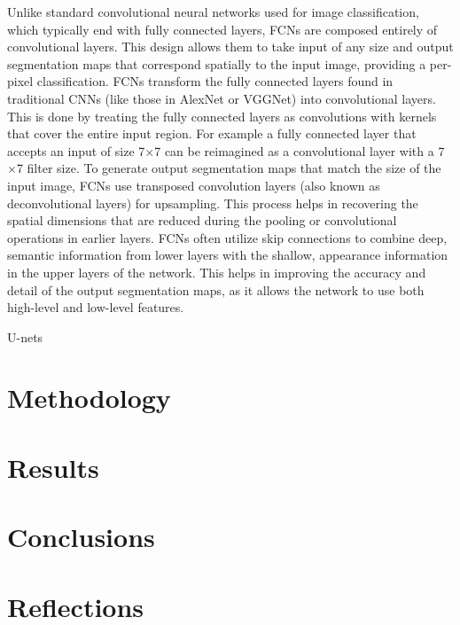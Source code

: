 \documentclass[a4paper,11pt]{article}
\begin{document}
Unlike standard convolutional neural networks used for image classification, which typically end with fully connected layers, FCNs are composed entirely of convolutional layers. This design allows them to take input of any size and output segmentation maps that correspond spatially to the input image, providing a per-pixel classification. FCNs transform the fully connected layers found in traditional CNNs (like those in AlexNet or VGGNet) into convolutional layers. This is done by treating the fully connected layers as convolutions with kernels that cover the entire input region. For example a fully connected layer that accepts an input of size 7$\times$7 can be reimagined as a convolutional layer with a 7$\times$7 filter size. To generate output segmentation maps that match the size of the input image, FCNs use transposed convolution layers (also known as deconvolutional layers) for upsampling. This process helps in recovering the spatial dimensions that are reduced during the pooling or convolutional operations in earlier layers. FCNs often utilize skip connections to combine deep, semantic information from lower layers with the shallow, appearance information in the upper layers of the network. This helps in improving the accuracy and detail of the output segmentation maps, as it allows the network to use both high-level and low-level features. 

U-nets

\section{Methodology}

\section{Results}

\section{Conclusions}

\section{Reflections}



\end{document}
